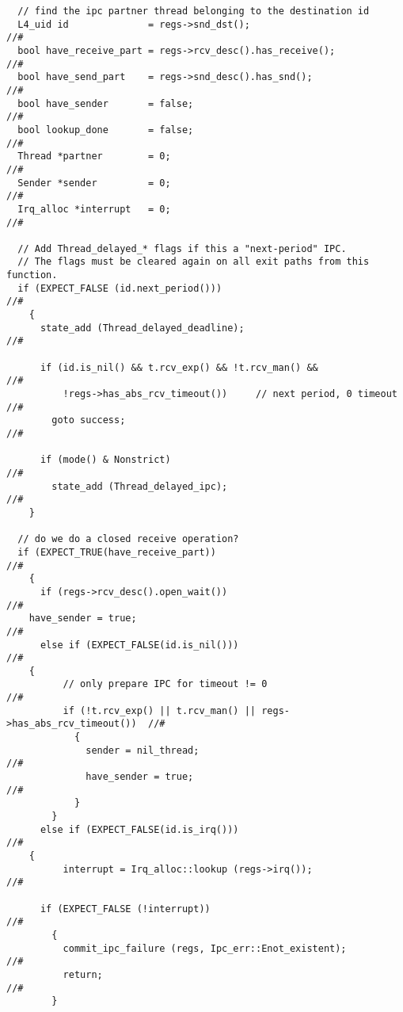 \begin{lstlisting}
  // find the ipc partner thread belonging to the destination id
  L4_uid id              = regs->snd_dst();                                //#
  bool have_receive_part = regs->rcv_desc().has_receive();                 //#
  bool have_send_part    = regs->snd_desc().has_snd();                     //#
  bool have_sender       = false;                                          //#
  bool lookup_done       = false;                                          //#
  Thread *partner        = 0;                                              //#
  Sender *sender         = 0;                                              //#
  Irq_alloc *interrupt 	 = 0;                                              //#   
  
  // Add Thread_delayed_* flags if this a "next-period" IPC.
  // The flags must be cleared again on all exit paths from this function.
  if (EXPECT_FALSE (id.next_period()))                                     //#
    {
      state_add (Thread_delayed_deadline);                                 //#

      if (id.is_nil() && t.rcv_exp() && !t.rcv_man() &&                    //#
          !regs->has_abs_rcv_timeout())		// next period, 0 timeout  //#
        goto success;                                                      //#

      if (mode() & Nonstrict)                                              //#
        state_add (Thread_delayed_ipc);                                    //#
    }
  
  // do we do a closed receive operation?
  if (EXPECT_TRUE(have_receive_part))                                      //#
    {
      if (regs->rcv_desc().open_wait())                                    //#
	have_sender = true;                                                //#
      else if (EXPECT_FALSE(id.is_nil()))                                  //#
	{
          // only prepare IPC for timeout != 0                             //# 
          if (!t.rcv_exp() || t.rcv_man() || regs->has_abs_rcv_timeout())  //#
            {
              sender = nil_thread;                                         //#  
              have_sender = true;                                          //#
            }
        }
      else if (EXPECT_FALSE(id.is_irq()))                                  //#
	{	
          interrupt = Irq_alloc::lookup (regs->irq());                     //#

	  if (EXPECT_FALSE (!interrupt))                                   //#
	    {
	      commit_ipc_failure (regs, Ipc_err::Enot_existent);           //#
	      return;                                                      //#
	    }


\end{lstlisting}
